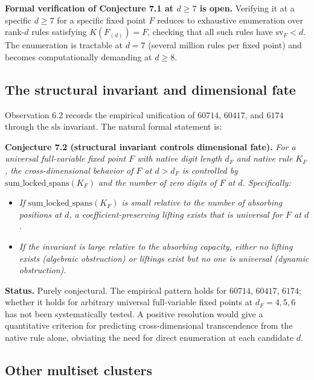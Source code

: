 \documentclass[11pt,letterpaper]{article}
\providecommand{\tightlist}{%
  \setlength{\itemsep}{0pt}\setlength{\parskip}{0pt}}
\theoremstyle{paperstyle}
\theoremstyle{paperstyledef}
\theoremstyle{paperstylerem}
\begin{document}
\textbf{Formal verification of Conjecture 7.1 at \(d \geq 7\) is open.}
Verifying it at a specific \(d \geq 7\) for a specific fixed point \(F\)
reduces to exhaustive enumeration over rank-\(d\) rules satisfying
\(K(F_{(d)}) = F\), checking that all such rules have
\(\mathrm{sv}_F < d\). The enumeration is tractable at \(d = 7\)
(several million rules per fixed point) and becomes computationally
demanding at \(d \geq 8\).

\hypertarget{the-structural-invariant-and-dimensional-fate}{%
\subsection{The structural invariant and dimensional fate}\label{the-structural-invariant-and-dimensional-fate}}

Observation 6.2 records the empirical unification of \(60714\),
\(60417\), and \(6174\) through the \(\mathrm{sls}\) invariant. The
natural formal statement is:

\textbf{Conjecture 7.2 (structural invariant controls dimensional
fate).} \emph{For a universal full-variable fixed point \(F\) with
native digit length \(d_F\) and native rule \(K_F\), the
cross-dimensional behavior of \(F\) at \(d > d_F\) is controlled by
\(\mathrm{sum\_locked\_spans}(K_F)\) and the number of zero digits of
\(F\) at \(d\). Specifically:}

\begin{itemize}
\tightlist
\item
  \emph{If \(\mathrm{sum\_locked\_spans}(K_F)\) is small relative to the
  number of absorbing positions at \(d\), a coefficient-preserving
  lifting exists that is universal for \(F\) at \(d\).}
\item
  \emph{If the invariant is large relative to the absorbing capacity,
  either no lifting exists (algebraic obstruction) or liftings exist but
  no one is universal (dynamic obstruction).}
\end{itemize}

\textbf{Status.} Purely conjectural. The empirical pattern holds for
\(60714\), \(60417\), \(6174\); whether it holds for arbitrary universal
full-variable fixed points at \(d_F = 4, 5, 6\) has not been
systematically tested. A positive resolution would give a quantitative
criterion for predicting cross-dimensional transcendence from the native
rule alone, obviating the need for direct enumeration at each candidate
\(d\).

\hypertarget{other-multiset-clusters}{%
\subsection{Other multiset clusters}\label{other-multiset-clusters}}
\end{document}
